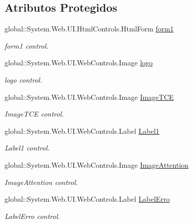 \subsection*{Atributos Protegidos}
\begin{DoxyCompactItemize}
\item 
global::System.Web.UI.HtmlControls.HtmlForm \hyperlink{class_sistema_r_h_1_1_login_acf1a43f54fa815ad39795f34a5dd8e8d}{form1}
\begin{DoxyCompactList}\small\item\em form1 control. \item\end{DoxyCompactList}\item 
global::System.Web.UI.WebControls.Image \hyperlink{class_sistema_r_h_1_1_login_afc6748e829a1cf51cbed2993bbc3df94}{logo}
\begin{DoxyCompactList}\small\item\em logo control. \item\end{DoxyCompactList}\item 
global::System.Web.UI.WebControls.Image \hyperlink{class_sistema_r_h_1_1_login_a3db8c619eae0b16d08f2adae437b207a}{ImageTCE}
\begin{DoxyCompactList}\small\item\em ImageTCE control. \item\end{DoxyCompactList}\item 
global::System.Web.UI.WebControls.Label \hyperlink{class_sistema_r_h_1_1_login_aeb9e2c2e0fa927b77dd6c879c4eddc66}{Label1}
\begin{DoxyCompactList}\small\item\em Label1 control. \item\end{DoxyCompactList}\item 
global::System.Web.UI.WebControls.Image \hyperlink{class_sistema_r_h_1_1_login_a79e2f7ee9a557ce251e4a2f69dc3a5a8}{ImageAttention}
\begin{DoxyCompactList}\small\item\em ImageAttention control. \item\end{DoxyCompactList}\item 
global::System.Web.UI.WebControls.Label \hyperlink{class_sistema_r_h_1_1_login_a7683e36c7bed32338b3c0bc779b94227}{LabelErro}
\begin{DoxyCompactList}\small\item\em LabelErro control. \item\end{DoxyCompactList}\item 

\end{DoxyCompactItemize}
